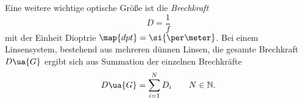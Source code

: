 Eine weitere wichtige optische Größe ist die \emph{Brechkraft}
\begin{equation}
  \label{eq: brechkraft}
  D=\frac{1}{f}
\end{equation}
mit der Einheit Dioptrie $\map{dpt}=\si{\per \meter}$.
Bei einem Linsensystem, bestehend aus mehreren dünnen Linsen, die gesamte %
Brechkraft $D\ua{G}$ ergibt sich aus Summation der einzelnen Brechkräfte %
\begin{equation*}
  D\ua{G}=\sum_{i=1}^{N}D_i \qquad N\in\mathbb{N}.
\end{equation*}
